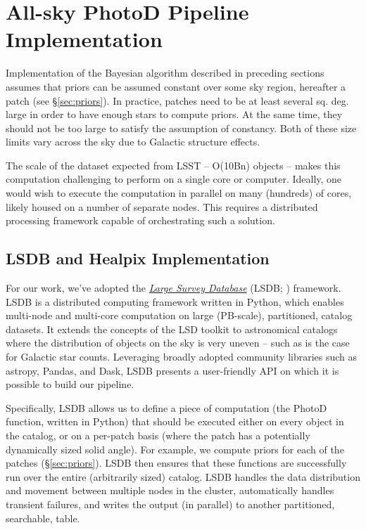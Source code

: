 

\section{All-sky PhotoD Pipeline Implementation \label{sec:LSDBpipe}}



Implementation of the Bayesian algorithm described in preceding sections assumes that priors can be assumed constant over some sky region, hereafter a patch (see \S\ref{sec:priors}). In practice,  patches need to be at least several sq. deg. large in order to have enough stars to compute priors. At the same time, they should not be too large to satisfy the assumption of constancy. Both of these size limits vary across the sky due to Galactic structure effects. 

The scale of the dataset expected from LSST -- O(10Bn) objects -- makes this
computation challenging to perform on a single core or computer. Ideally,
one would wish to execute the computation in parallel on many (hundreds) of cores,
likely housed on a number of separate nodes. This requires a distributed
processing framework capable of orchestrating such a solution.

\subsection{LSDB and Healpix Implementation} 

For our work, we've adopted the \href{https://lsdb.readthedocs.io/}{\em Large Survey Database} (LSDB; \cite{2024AAS...24326109W})
framework.  LSDB is a distributed computing framework written in Python,
which enables multi-node and multi-core computation on large (PB-scale),
partitioned, catalog datasets.  It extends the concepts of the LSD toolkit
\citep{2011AAS...21743319J}
to astronomical catalogs where the distribution of objects on the sky is
very uneven -- such as is the case for Galactic star counts.  Leveraging
broadly adopted community libraries such as astropy, Pandas, and Dask, LSDB
presents a user-friendly API on which it is possible to build our pipeline.

Specifically, LSDB allows us to define a piece of computation (the PhotoD
function, written in Python) that should be executed either on every object in
the catalog, or on a per-patch basis (where the patch has a potentially
dynamically sized solid angle). For example, we compute priors for each of the 
patches (\S\ref{sec:priors}). LSDB then ensures that these functions are successfully run over the entire (arbitrarily sized) catalog. LSDB handles the data distribution and
movement between multiple nodes in the cluster, automatically handles
transient failures, and writes the output (in parallel) to another
partitioned, searchable, table.

